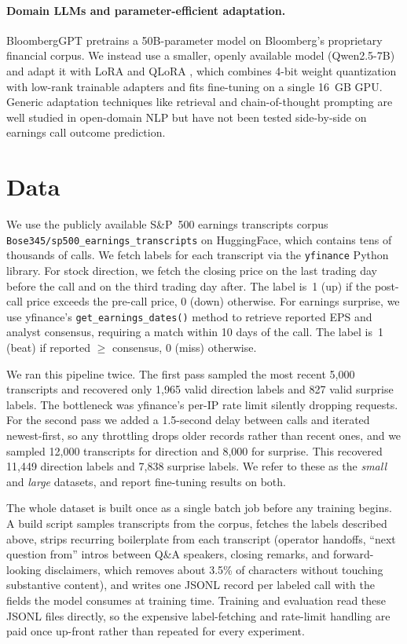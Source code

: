 \documentclass[11pt]{article}
\begin{document}
\paragraph{Domain LLMs and parameter-efficient adaptation.}
BloombergGPT \citep{Wu2023} pretrains a 50B-parameter model on
Bloomberg's proprietary financial corpus. We instead use a smaller,
openly available model (Qwen2.5-7B) and adapt it with LoRA
\citep{Hu2022} and QLoRA \citep{Dettmers2023}, which combines 4-bit
weight quantization with low-rank trainable adapters and fits
fine-tuning on a single 16~GB GPU. Generic adaptation techniques like
retrieval \citep{Lewis2020} and chain-of-thought prompting
\citep{Wei2022} are well studied in open-domain NLP but have not been
tested side-by-side on earnings call outcome prediction.

\endgroup

\section{Data}
\label{sec:data}

We use the publicly available S\&P~500 earnings transcripts corpus
\texttt{Bose345/\allowbreak sp500\_earnings\_\allowbreak transcripts}
on HuggingFace, which contains tens of thousands of calls. We fetch
labels for each transcript via the \texttt{yfinance} Python library.
For stock direction, we fetch the closing price on the last trading
day before the call and on the third trading day after. The label
is~1 (up) if the post-call price exceeds the pre-call price, 0
(down) otherwise. For earnings surprise, we use yfinance's
\texttt{get\_earnings\_dates()} method to retrieve reported EPS and
analyst consensus, requiring a match within 10 days of the call. The
label is~1 (beat) if reported $\geq$ consensus, 0 (miss) otherwise.

We ran this pipeline twice. The first pass sampled the most recent
5{,}000 transcripts and recovered only 1{,}965 valid direction
labels and 827 valid surprise labels. The bottleneck was yfinance's
per-IP rate limit silently dropping requests. For the second pass we
added a 1.5-second delay between calls and iterated newest-first, so
any throttling drops older records rather than recent ones, and we
sampled 12{,}000 transcripts for direction and 8{,}000 for surprise.
This recovered 11{,}449 direction labels and 7{,}838 surprise
labels. We refer to these as the \emph{small} and \emph{large}
datasets, and report fine-tuning results on both.

The whole dataset is built once as a single batch job before any
training begins. A build script samples transcripts from the corpus,
fetches the labels described above, strips recurring boilerplate
from each transcript (operator handoffs, ``next question from''
intros between Q\&A speakers, closing remarks, and forward-looking
disclaimers, which removes about 3.5\% of characters without
touching substantive content), and writes one JSONL record per
labeled call with the fields the model consumes at training time.
Training and evaluation read these JSONL files directly, so the
expensive label-fetching and rate-limit handling are paid once
up-front rather than repeated for every experiment.
\end{document}
